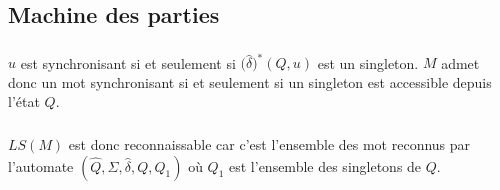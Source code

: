 \subsection{Machine des parties}
\subsubsection{}
$u$ est synchronisant si et seulement si $\bigl(\hat \delta\bigr)^*(Q, u)$ est un singleton. $M$ admet donc un mot synchronisant si et seulement si un singleton est accessible depuis l'état $Q$.
\subsubsection{}
 $LS(M)$ est donc reconnaissable car c'est l'ensemble des mot reconnus par l'automate
$(\widehat Q,\Sigma,\hat \delta,Q,Q_1)$ où $Q_1$ est l'ensemble des singletons de $Q$.

